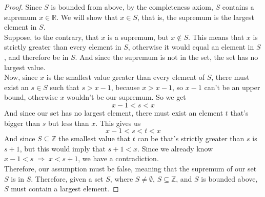 \documentclass[11pt]{article}
\begin{document}
\begin{proof}
  Since $S$ is bounded from above, by the completeness axiom, $S$ contains a supremum 
  $x \in \mathbb{R}$.  We will show that $x \in S$, that is, the supremum is the largest 
  element in $S$. \\

  Suppose, to the contrary, that $x$ is a supremum, but $x \not\in S$.  This means that 
  $x$ is strictly greater than every element in $S$, otherwise it would equal an 
  element in $S$, and therefore be in $S$.  And since the supremum is not in the set, 
  the set has no largest value. \\

  Now, since $x$ is the smallest value greater than every element of $S$, there 
  must exist an $s \in S$ such that $s > x-1$, because $x > x-1$, so $x-1$ can't be an 
  upper bound, otherwise $x$ wouldn't be our supremum.  So we get 
  $$x-1 < s < x$$
  And since our set has no largest element, there must exist an element $t$ that's bigger 
  than $s$ but less than $x$.  This gives us
  $$x-1 < s < t < x$$
  And since $S \subseteq \mathbb{Z}$ the smallest value that $t$ can be that's strictly 
  greater than $s$ is $s+1$, but this would imply that $s+1 < x$.  Since we already know 
  $x-1 < s \;\Rightarrow\; x < s+1$, we have a contradiction. \\

  Therefore, our assumption must be false, meaning that the supremum of our set $S$ is 
  in $S$.  Therefore, given a set $S$, where $S \neq \emptyset$, $S \subseteq \mathbb{Z}$, 
  and $S$ is bounded above, $S$ must contain a largest element.

\end{proof}
\end{document}

